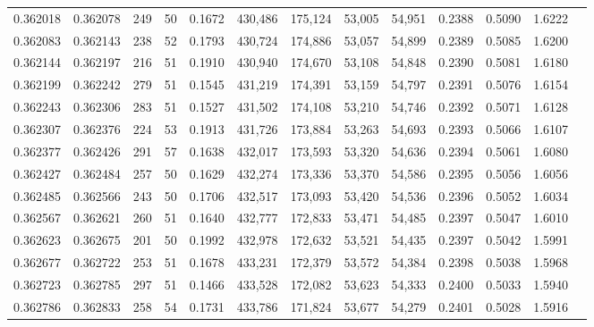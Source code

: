 \begin{tabular}{rrrrrrrrrrrrr}
0.362018 & 0.362078 &   249 &  50 &                                     0.1672 & 430,486 & 175,124 &  53,005 &  54,951 & 0.2388 & 0.5090 & 1.6222 \\
0.362083 & 0.362143 &   238 &  52 &                                     0.1793 & 430,724 & 174,886 &  53,057 &  54,899 & 0.2389 & 0.5085 & 1.6200 \\
0.362144 & 0.362197 &   216 &  51 &                                     0.1910 & 430,940 & 174,670 &  53,108 &  54,848 & 0.2390 & 0.5081 & 1.6180 \\
0.362199 & 0.362242 &   279 &  51 &                                     0.1545 & 431,219 & 174,391 &  53,159 &  54,797 & 0.2391 & 0.5076 & 1.6154 \\
0.362243 & 0.362306 &   283 &  51 &                                     0.1527 & 431,502 & 174,108 &  53,210 &  54,746 & 0.2392 & 0.5071 & 1.6128 \\
0.362307 & 0.362376 &   224 &  53 &                                     0.1913 & 431,726 & 173,884 &  53,263 &  54,693 & 0.2393 & 0.5066 & 1.6107 \\
0.362377 & 0.362426 &   291 &  57 &                                     0.1638 & 432,017 & 173,593 &  53,320 &  54,636 & 0.2394 & 0.5061 & 1.6080 \\
0.362427 & 0.362484 &   257 &  50 &                                     0.1629 & 432,274 & 173,336 &  53,370 &  54,586 & 0.2395 & 0.5056 & 1.6056 \\
0.362485 & 0.362566 &   243 &  50 &                                     0.1706 & 432,517 & 173,093 &  53,420 &  54,536 & 0.2396 & 0.5052 & 1.6034 \\
0.362567 & 0.362621 &   260 &  51 &                                     0.1640 & 432,777 & 172,833 &  53,471 &  54,485 & 0.2397 & 0.5047 & 1.6010 \\
0.362623 & 0.362675 &   201 &  50 &                                     0.1992 & 432,978 & 172,632 &  53,521 &  54,435 & 0.2397 & 0.5042 & 1.5991 \\
0.362677 & 0.362722 &   253 &  51 &                                     0.1678 & 433,231 & 172,379 &  53,572 &  54,384 & 0.2398 & 0.5038 & 1.5968 \\
0.362723 & 0.362785 &   297 &  51 &                                     0.1466 & 433,528 & 172,082 &  53,623 &  54,333 & 0.2400 & 0.5033 & 1.5940 \\
0.362786 & 0.362833 &   258 &  54 &                                     0.1731 & 433,786 & 171,824 &  53,677 &  54,279 & 0.2401 & 0.5028 & 1.5916 \\

\end{tabular}
